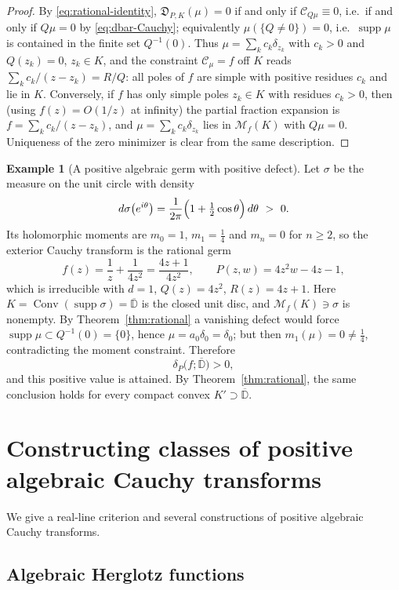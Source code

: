 \documentclass[reqno]{amsart}
\theoremstyle{definition}
\newtheorem{example}[theorem]{Example}
\theoremstyle{remark}
\newcommand{\M}{\mathcal M}
\newcommand{\Cauchy}{\mathcal C}
\newcommand{\supp}{\operatorname{supp}}
\newcommand{\Conv}{\operatorname{Conv}}
\newcommand{\Db}{\mathbb D}
\begin{document}
\begin{proof}
By \eqref{eq:rational-identity}, $\mathfrak D_{P,K}(\mu)=0$ if and only if
$\Cauchy_{Q\mu}\equiv0$, i.e.\ if and only if $Q\mu=0$ by
\eqref{eq:dbar-Cauchy}; equivalently $\mu(\{Q\neq0\})=0$, i.e.\ $\supp\mu$ is
contained in the finite set $Q^{-1}(0)$.  Thus $\mu=\sum_kc_k\delta_{z_k}$ with
$c_k>0$ and $Q(z_k)=0$, $z_k\in K$, and the constraint $\Cauchy_\mu=f$ off $K$
reads $\sum_kc_k/(z-z_k)=R/Q$: all poles of $f$ are simple with positive
residues $c_k$ and lie in $K$.  Conversely, if $f$ has only simple poles $z_k\in
K$ with residues $c_k>0$, then (using $f(z)=O(1/z)$ at infinity) the partial
fraction expansion is $f=\sum_kc_k/(z-z_k)$, and $\mu=\sum_kc_k\delta_{z_k}$
lies in $\M_f(K)$ with $Q\mu=0$.  Uniqueness of the zero minimizer is clear from
the same description.
\end{proof}

\begin{example}[A positive algebraic germ with positive defect]
\label{ex:positive-defect}
Let $\sigma$ be the measure on the unit circle with density
\[
 d\sigma\bigl(e^{i\theta}\bigr)
 =\frac{1}{2\pi}\Bigl(1+\tfrac12\cos\theta\Bigr)\,d\theta\ >\ 0 .
\]
Its holomorphic moments are $m_0=1$, $m_1=\tfrac14$ and $m_n=0$ for $n\geq2$,
so the exterior Cauchy transform is the rational germ
\[
 f(z)=\frac1z+\frac{1}{4z^{2}}=\frac{4z+1}{4z^{2}} ,
 \qquad
 P(z,w)=4z^{2}w-4z-1 ,
\]
which is irreducible with $d=1$, $Q(z)=4z^2$, $R(z)=4z+1$.  Here
$K=\Conv(\supp\sigma)=\overline{\Db}$ is the closed unit disc, and
$\M_f(K)\ni\sigma$ is nonempty.  By Theorem~\ref{thm:rational} a vanishing
defect would force $\supp\mu\subset Q^{-1}(0)=\{0\}$, hence $\mu=a_0\delta_0=
\delta_0$; but then $m_1(\mu)=0\neq\tfrac14$, contradicting the moment
constraint.  Therefore
\[
 \delta_P\bigl(f;\overline{\Db}\bigr)>0 ,
\]
and this positive value is attained.  By Theorem~\ref{thm:rational}, the same
conclusion holds for every compact convex $K'\supset\overline{\Db}$.
\end{example}


\section{Constructing classes of positive algebraic Cauchy transforms}
\label{sec:constructive}

We give a real-line criterion and several constructions of positive algebraic
Cauchy transforms.

\subsection{Algebraic Herglotz functions}
\end{document}

